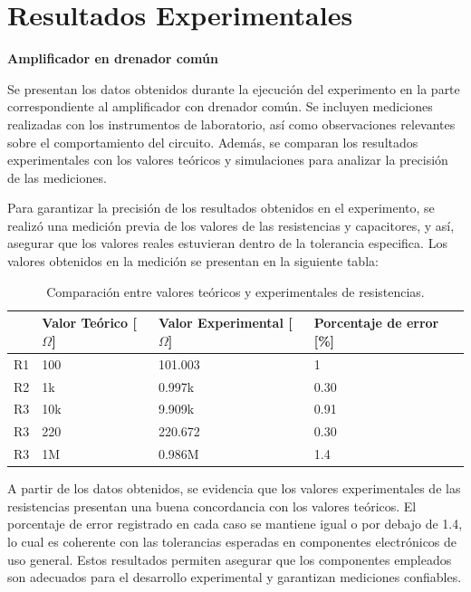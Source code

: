\documentclass[journal]{IEEEtran}
\begin{document}
\section{Resultados Experimentales}
\textbf{Amplificador en drenador común}
\par Se presentan los datos obtenidos durante la ejecución del experimento en la parte correspondiente al amplificador con drenador común. Se incluyen mediciones realizadas con los instrumentos de laboratorio, así como observaciones relevantes sobre el comportamiento del circuito. Además, se comparan los resultados experimentales con los valores teóricos y simulaciones para analizar la precisión de las mediciones.
\par Para garantizar la precisión de los resultados obtenidos en el experimento, se realizó una medición previa de los valores de las resistencias y capacitores, y así, asegurar que los valores reales estuvieran dentro de la tolerancia especifica. Los valores obtenidos en la medición se presentan en la siguiente tabla:
\begin{table}[h]
    \caption{Comparación entre valores teóricos y experimentales de resistencias.}
    \centering
    \renewcommand{\arraystretch}{1.2} %
    \begin{tabular}{|l|p{2cm}|p{2cm}|p{2cm}|}
        \hline
        & \textbf{Valor Teórico [$\Omega$]} & \textbf{Valor Experimental [$\Omega$]} & \textbf{Porcentaje de error [\%]} \\
        \hline
        R1 & 100  & 101.003  & 1 \\
        \hline
        R2 & 1k   & 0.997k  & 0.30 \\
        \hline
        R3 & 10k & 9.909k & 0.91 \\
        \hline
        R3 & 220 & 220.672 & 0.30 \\
        \hline
        R3 & 1M & 0.986M & 1.4 \\
        \hline
    \end{tabular}
    \label{tab:resistencias}
\end{table}
\par A partir de los datos obtenidos, se evidencia que los valores experimentales de las resistencias presentan una buena concordancia con los valores teóricos. El porcentaje de error registrado en cada caso se mantiene igual o por debajo de 1.4, lo cual es coherente con las tolerancias esperadas en componentes electrónicos de uso general. Estos resultados permiten asegurar que los componentes empleados son adecuados para el desarrollo experimental y garantizan mediciones confiables.
\end{document}
